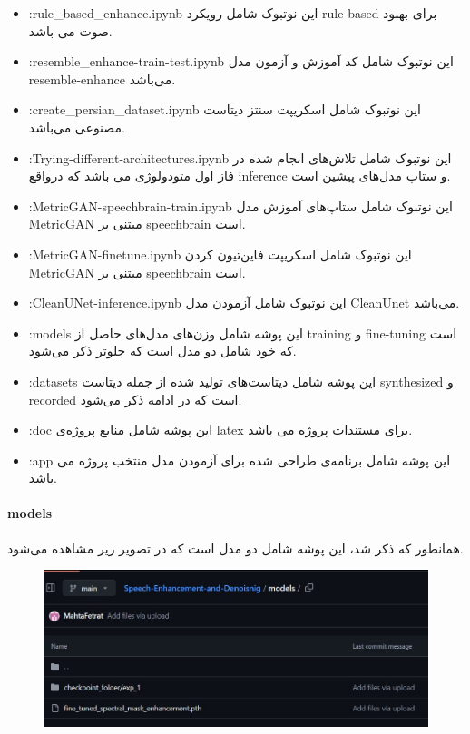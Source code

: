 \documentclass[fleqn]{report}
\begin{document}
\begin{itemize}
    \item :rule\_based\_enhance.ipynb این نوتبوک شامل رویکرد rule-based برای بهبود صوت می باشد.
    \item :resemble\_enhance-train-test.ipynb این نوتبوک شامل کد آموزش و آزمون مدل resemble-enhance می‌باشد.
    \item :create\_persian\_dataset.ipynb این نوتبوک شامل اسکریپت سنتز دیتاست مصنوعی می‌باشد.
    \item :Trying-different-architectures.ipynb این نوتبوک شامل تلاش‌های انجام شده در فاز اول متودولوژی می باشد که درواقع inference و ستاپ مدل‌های پیشین است.
    \item :MetricGAN-speechbrain-train.ipynb این نوتبوک شامل ستاپ‌های آموزش مدل MetricGAN مبتنی بر speechbrain است.
    \item :MetricGAN-finetune.ipynb این نوتبوک شامل اسکریپت فاین‌تیون کردن MetricGAN مبتنی بر speechbrain است.
    \item :CleanUNet-inference.ipynb این نوتبوک شامل آزمودن مدل CleanUnet می‌باشد.
    \item :models این پوشه شامل وز‌ن‌های مدل‌های حاصل از training و fine-tuning است که خود شامل دو مدل است که جلوتر ذکر می‌شود.
    \item :datasets این پوشه شامل دیتاست‌های تولید شده از جمله دیتاست synthesized و recorded است که در ادامه ذکر می‌شود.
    \item :doc این پوشه شامل منابع پروژه‌ی latex برای مستندات پروژه می باشد.
    \item :app این پوشه شامل برنامه‌ی طراحی شده برای آزمودن مدل منتخب پروژه می باشد.
\end{itemize}

\paragraph{models} همانطور که ذکر شد، این پوشه شامل دو مدل است که در تصویر زیر مشاهده می‌شود.

\begin{figure}[h]

    \centering
    \includegraphics[width=\textwidth, keepaspectratio]{images/models.jpg}
    
    \caption{}
    \label{fig:models}
\end{figure}
\end{document}
